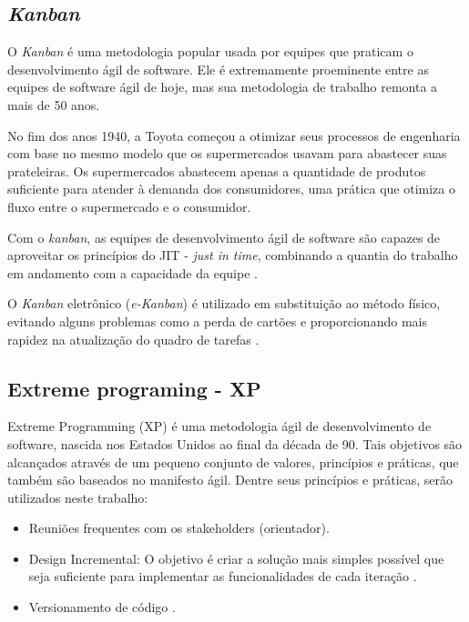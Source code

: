 \subsection{\textit{Kanban}}
\label{sec:kanban}
O \textit{Kanban} é uma metodologia popular usada por equipes que praticam o desenvolvimento ágil de software. Ele é extremamente proeminente entre as equipes de software ágil de hoje, mas sua metodologia de trabalho remonta a mais de 50 anos.

No fim dos anos 1940, a Toyota começou a otimizar seus processos de engenharia com base no mesmo modelo que os supermercados usavam para abastecer suas prateleiras. Os supermercados abastecem apenas a quantidade de produtos suficiente para atender à demanda dos consumidores, uma prática que otimiza o fluxo entre o supermercado e o consumidor.

Com o \textit{kanban}, as equipes de desenvolvimento ágil de software são capazes de aproveitar os princípios do JIT - \textit{just in time}, combinando a quantia do trabalho em andamento com a capacidade da equipe \cite{kanban1}.

O \textit{Kanban} eletrônico (\textit{e-Kanban}) é utilizado em substituição ao método físico, evitando alguns problemas como a perda de cartões e proporcionando mais rapidez na atualização do quadro de tarefas \cite{kanban}.



\subsection{Extreme programing - XP}
\label{sec:xp}
Extreme Programming (XP) é uma metodologia ágil de desenvolvimento de software,
nascida nos Estados Unidos ao final da década de 90. Tais objetivos são
alcançados através de um pequeno conjunto de valores, princípios
 e práticas, que também são baseados no manifesto ágil. Dentre seus princípios
e práticas, serão utilizados neste trabalho:

  \begin{itemize}
  \item Reuniões frequentes com os stakeholders (orientador).
  \item Design Incremental: O objetivo é criar a solução mais simples possível
  que seja suficiente para implementar as funcionalidades de cada iteração \cite{praticaXp}.
  \item Versionamento de código \cite{praticaXp}.
  \end{itemize}

